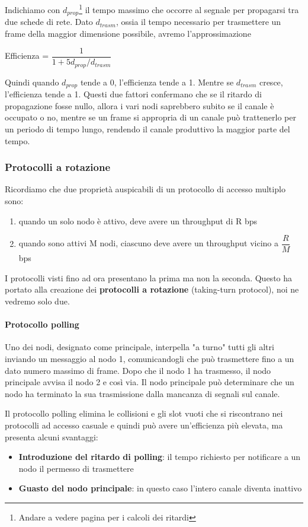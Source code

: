 \documentclass[11pt,a4paper]{article}
\begin{document}
Indichiamo con $d_{prop}$\footnote{Andare a vedere pagina \pageref{par: ritardi} per i calcoli dei ritardi} il tempo massimo che occorre al segnale per propagarsi tra due schede di rete. Dato $d_{trasm}$, ossia il tempo necessario per trasmettere un frame della maggior dimensione possibile, avremo l'approssimazione
\begin{center}
	Efficienza = $\dfrac{1}{1 + 5d_{prop}/d_{trasm}}$
\end{center}
Quindi quando $d_{prop}$ tende a 0, l'efficienza tende a 1. Mentre se $d_{trasm}$ cresce, l'efficienza tende a 1. Questi due fattori confermano che se il ritardo di propagazione fosse nullo, allora i vari nodi saprebbero subito se il canale è occupato o no, mentre se un frame si appropria di un canale può trattenerlo per un periodo di tempo lungo, rendendo il canale produttivo la maggior parte del tempo.

\subsubsection{Protocolli a rotazione}
Ricordiamo che due proprietà auspicabili di un protocollo di accesso multiplo sono:
\begin{enumerate}
	\item quando un solo nodo  è attivo, deve avere un throughput di R bps
	\item quando sono attivi M nodi, ciascuno deve avere un throughput vicino a $\dfrac{R}{M}$ bps
\end{enumerate}
I protocolli visti fino ad ora presentano la prima ma non la seconda. Questo ha portato alla creazione dei \textbf{protocolli a rotazione} (taking-turn protocol), noi ne vedremo solo due.
\paragraph{Protocollo polling}
Uno dei nodi, designato come principale, interpella "a turno" tutti gli altri inviando un messaggio al nodo 1, comunicandogli che può trasmettere fino a un dato numero massimo di frame. Dopo che il nodo 1 ha trasmesso, il nodo principale avvisa il nodo 2 e così via. Il nodo principale può determinare che un nodo ha terminato la sua trasmissione dalla mancanza di segnali sul canale.

Il protocollo polling elimina le collisioni e gli slot vuoti che si riscontrano nei protocolli ad accesso casuale e quindi può avere un'efficienza più elevata, ma presenta alcuni svantaggi:
\begin{itemize}
	\item \textbf{Introduzione del ritardo di polling}: il tempo richiesto per notificare a un nodo il permesso di trasmettere
	\item \textbf{Guasto del nodo principale}: in questo caso l'intero canale diventa inattivo
\end{itemize}
\end{document}
